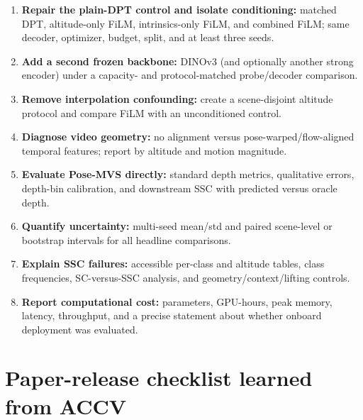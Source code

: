 \documentclass[10pt]{article}
\begin{document}
\begin{enumerate}[leftmargin=*,label=\textbf{P\arabic*.}]
  \item \textbf{Repair the plain-DPT control and isolate conditioning:} matched DPT,
  altitude-only FiLM, intrinsics-only FiLM, and combined FiLM; same decoder, optimizer,
  budget, split, and at least three seeds.
  \item \textbf{Add a second frozen backbone:} DINOv3 (and optionally another strong
  encoder) under a capacity- and protocol-matched probe/decoder comparison.
  \item \textbf{Remove interpolation confounding:} create a scene-disjoint altitude
  protocol and compare FiLM with an unconditioned control.
  \item \textbf{Diagnose video geometry:} no alignment versus pose-warped/flow-aligned
  temporal features; report by altitude and motion magnitude.
  \item \textbf{Evaluate Pose-MVS directly:} standard depth metrics, qualitative errors,
  depth-bin calibration, and downstream SSC with predicted versus oracle depth.
  \item \textbf{Quantify uncertainty:} multi-seed mean/std and paired scene-level or
  bootstrap intervals for all headline comparisons.
  \item \textbf{Explain SSC failures:} accessible per-class and altitude tables, class
  frequencies, SC-versus-SSC analysis, and geometry/context/lifting controls.
  \item \textbf{Report computational cost:} parameters, GPU-hours, peak memory, latency,
  throughput, and a precise statement about whether onboard deployment was evaluated.
\end{enumerate}

\section{Paper-release checklist learned from ACCV}
\end{document}
